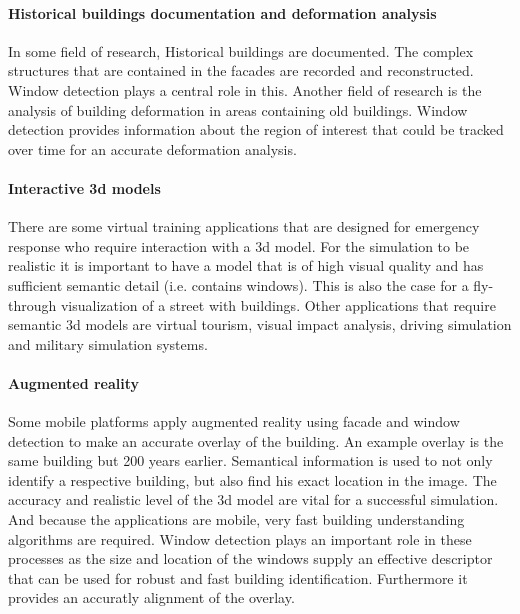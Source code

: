 \paragraph{Historical buildings documentation and deformation analysis}
	In some field of research, Historical buildings are documented. The complex
	structures that are contained in the facades are recorded and reconstructed.
	Window detection plays a central role in this. 
	Another field of research is the analysis of building deformation in areas
	containing old buildings.  Window detection provides information about the
	region of interest that could be tracked over time for an accurate
	deformation analysis.


\paragraph{Interactive 3d models}
	There are some virtual training applications that are designed for
	emergency response who require interaction with a 3d model.  
	For the simulation to be realistic it is important to have a model that is
	of high visual quality and has sufficient semantic detail (i.e. contains
	windows).  This is also the case for a fly-through visualization of a street with
	buildings.
	Other applications that require semantic 3d models are virtual tourism,
	visual impact analysis, driving simulation and military simulation systems.

\paragraph{Augmented reality}
	Some mobile platforms apply augmented reality using facade and window
	detection to make an accurate overlay of the building. An example overlay is the
	same building but 200 years earlier.  Semantical information is used to not
	only identify a respective building, but also find his exact location in the
	image.  The accuracy and realistic level of the 3d model are vital for a
	successful simulation.  And because the applications are mobile, very fast
	building understanding algorithms are required.  
	Window detection plays an
	important role in these processes as the size and location of the windows
	supply an effective descriptor that can be used for robust and fast building
	identification.  Furthermore it provides an accuratly alignment of the
	overlay.


